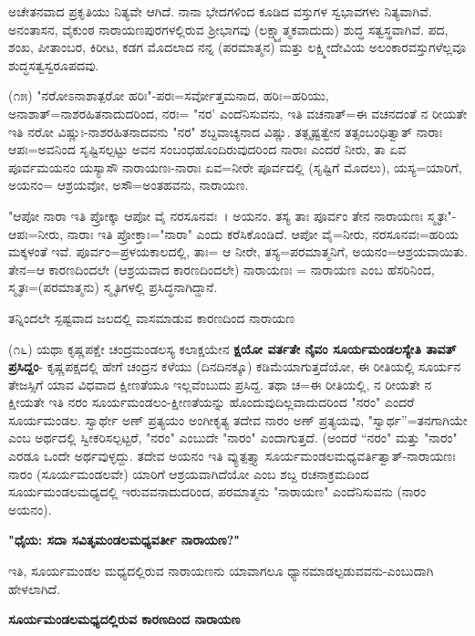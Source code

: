 
\noindent
ಅಚೇತನವಾದ ಪ್ರಕೃತಿಯು ನಿತ್ಯವೇ ಆಗಿದೆ. ನಾನಾ ಭೇದಗಳಿಂದ ಕೂಡಿದ ವಸ್ತುಗಳ ಸ್ವಭಾವಗಳು ನಿತ್ಯವಾಗಿವೆ. ಅನಂತಾಸನ, ವೈಕುಂಠ ನಾರಾಯಣಪುರಗಳಲ್ಲಿರುವ ಶ‍್ರೀಭಾಗವು (ಲಕ್ಷ್ಮ್ಯಾತ್ಮಕವಾದುದು) ಶುದ್ಧ ಸತ್ವಸ್ಥವಾಗಿವೆ. ಪದ, ಶಂಖ, ಪೀತಾಂಬರ, ಕಿರೀಟ, ಕಡಗ ಮೊದಲಾದ ನನ್ನ (ಪರಮಾತ್ಮನ) ಮತ್ತು ಲಕ್ಷ್ಮೀದೇವಿಯ ಅಲಂಕಾರವಸ್ತುಗಳೆಲ್ಲವೂ ಶುದ್ಧಸತ್ವಸ್ವರೂಪದವು.

(೧೫) "ನರೋಽನಾಶಾತ್ಪರೋ ಹರಿಃ"-ಪರಃ=ಸರ್ವೋತ್ತಮನಾದ, ಹರಿಃ=ಹರಿಯು, ಅನಾಶಾತ್=ನಾಶರಹಿತನಾದುದರಿಂದ, ನರಃ= "ನರ' ಎಂದೆನಿಸುವನು, ಇತಿ ವಚನಾತ್=ಈ ವಚನದಂತೆ ನ ರೀಯತೇ ಇತಿ ನರೋ ವಿಷ್ಣುಃ-ನಾಶರಹಿತನಾದವನು "ನರ" ಶಬ್ದವಾಚ್ಯನಾದ ವಿಷ್ಣು. ತತ್ಸೃಷ್ಟತ್ವೇನ ತತ್ಸಂಬಂಧಿತ್ವಾತ್ ನಾರಾಃ ಆಪಃ=ಅವನಿಂದ ಸೃಷ್ಟಿಸಲ್ಪಟ್ಟು ಅವನ ಸಂಬಂಧಹೊಂದಿರುವುದರಿಂದ ನಾರಾಃ ಎಂದರೆ ನೀರು, ತಾ ಏವ ಪೂರ್ವಮಯನಂ ಯಸ್ಯಾಸೌ ನಾರಾಯಣಃ-ನಾರಾಃ ಏವ=ನೀರೇ ಪೂರ್ವದಲ್ಲಿ (ಸೃಷ್ಟಿಗೆ ಮೊದಲು), ಯಸ್ಯ=ಯಾರಿಗೆ, ಅಯನಂ= ಆಶ್ರಯವೋ, ಅಸೌ=ಅಂತಹವನು, ನಾರಾಯಣ.

"ಆಪೋ ನಾರಾ ಇತಿ ಪ್ರೋಕ್ಕಾ ಆಪೋ ವೈ ನರಸೂನವಃ~। ಅಯನಂ. ತಸ್ಯ ತಾಃ ಪೂರ್ವಂ ತೇನ ನಾರಾಯಣಃ ಸ್ಮೃತಃ"-ಆಪಃ=ನೀರು, ನಾರಾಃ ಇತಿ ಪ್ರೋಕ್ತಾಃ="ನಾರಾ" ಎಂದು ಕರೆಸಿಕೊಂಡಿದೆ. ಆಪೋ ವೈ=ನೀರು, ನರಸೂನವಃ=ಹರಿಯ ಮಕ್ಕಳಂತೆ ಇವೆ. ಪೂರ್ವಂ=ಪ್ರಳಯಕಾಲದಲ್ಲಿ, ತಾಃ= ಆ ನೀರೇ, ತಸ್ಯ=ಪರಮಾತ್ಮನಿಗೆ, ಅಯನಂ=ಆಶ್ರಯವಾಯಿತು. ತೇನ=ಆ ಕಾರಣದಿಂದಲೇ (ಆಶ್ರಯವಾದ ಕಾರಣದಿಂದಲೇ) ನಾರಾಯಣಃ = ನಾರಾಯಣ ಎಂಬ ಹೆಸರಿನಿಂದ, ಸ್ಮೃತಃ=(ಪರಮಾತ್ಮನು) ಸ್ಮೃತಿಗಳಲ್ಲಿ ಪ್ರಸಿದ್ಧನಾಗಿದ್ದಾನೆ.

\begin{center}
ತನ್ನಿಂದಲೇ ಸ್ಪಷ್ಟವಾದ ಜಲದಲ್ಲಿ ವಾಸಮಾಡುವ ಕಾರಣದಿಂದ ನಾರಾಯಣ
\end{center}

(೧೬) ಯಥಾ ಕೃಷ್ಣಪಕ್ಷೇ ಚಂದ್ರಮಂಡಲಸ್ಯ ಕಲಾಕ್ಷಯೇನ \textbf{ಕ್ಷಯೋ ವರ್ತತೇ ನೈವಂ ಸೂರ್ಯಮಂಡಲಸ್ಯೇತಿ ತಾವತ್ ಪ್ರಸಿದ್ದಂ}- ಕೃಷ್ಣಪಕ್ಷದಲ್ಲಿ ಹೇಗೆ ಚಂದ್ರನ ಕಳೆಯು (ದಿನದಿನಕ್ಕೂ) ಕಡಿಮೆಯಾಗುತ್ತದೆಯೋ, ಈ ರೀತಿಯಲ್ಲಿ ಸೂರ್ಯನ ತೇಜಸ್ಸಿಗೆ ಯಾವ ವಿಧವಾದ ಕ್ಷೀಣತೆಯೂ ಇಲ್ಲವೆಂಬುದು ಪ್ರಸಿದ್ದ. ತಥಾ ಚ=ಈ ರೀತಿಯಲ್ಲಿ, ನ ರೀಯತೇ ನ ಕ್ಷೀಯತೇ ಇತಿ ನರಂ ಸೂರ್ಯಮಂಡಲಂ-ಕ್ಷೀಣತೆಯನ್ನು ಹೊಂದುವುದಿಲ್ಲವಾದುದರಿಂದ "ನರಂ" ಎಂದರೆ ಸೂರ್ಯಮಂಡಲ. ಸ್ವಾರ್ಥೇ ಅಣ್ ಪ್ರತ್ಯಯಂ ಅಂಗೀಕೃತ್ಯ ತದೇವ ನಾರಂ ಅಣ್ ಪ್ರತ್ಯಯವು, "ಸ್ವಾರ್ಥ''=ತನಗಾಗಿಯೇ ಎಂಬ ಅರ್ಥದಲ್ಲಿ ಸ್ವೀಕರಿಸಲ್ಪಟ್ಟರೆ, "ನರಂ" ಎಂಬುದೇ "ನಾರಂ" ಎಂದಾಗುತ್ತದೆ. (ಅಂದರೆ “ನರಂ" ಮತ್ತು "ನಾರಂ" ಎರಡೂ ಒಂದೇ ಅರ್ಥವುಳ್ಳದ್ದು. ತದೇವ ಅಯನಂ ಇತಿ ವ್ಯುತ್ಪತ್ತ್ಯಾ ಸೂರ್ಯಮಂಡಲಮಧ್ಯವರ್ತಿತ್ವಾತ್-ನಾರಾಯಣಃ ನಾರಂ (ಸೂರ್ಯಮಂಡಲವೇ) ಯಾರಿಗೆ ಆಶ್ರಯವಾಗಿದೆಯೋ ಎಂಬ ಶಬ್ದ ರಚನಾಕ್ರಮದಿಂದ ಸೂರ್ಯಮಂಡಲಮಧ್ಯದಲ್ಲಿ ಇರುವವನಾದುದರಿಂದ, ಪರಮಾತ್ಮನು "ನಾರಾಯಣ" ಎಂದೆನಿಸುವನು (ನಾರಂ ಅಯನಂ).

\begin{center}
\textbf{"ಧೈಯ: ಸದಾ ಸವಿತೃಮಂಡಲಮಧ್ಯವರ್ತೀ ನಾರಾಯಣ?"}
\end{center}

\noindent
ಇತಿ, ಸೂರ್ಯಮಂಡಲ ಮಧ್ಯದಲ್ಲಿರುವ ನಾರಾಯಣನು ಯಾವಾಗಲೂ ಧ್ಯಾನಮಾಡಲ್ಪಡುವವನು-ಎಂಬುದಾಗಿ ಹೇಳಲಾಗಿದೆ.

\begin{center}
\textbf{ಸೂರ್ಯಮಂಡಲಮಧ್ಯದಲ್ಲಿರುವ ಕಾರಣದಿಂದ ನಾರಾಯಣ}
\end{center}

